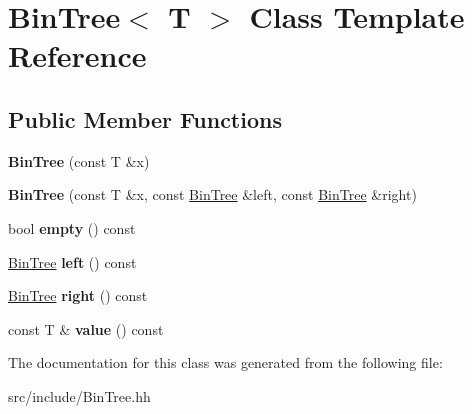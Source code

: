 \hypertarget{classBinTree}{}\section{Bin\+Tree$<$ T $>$ Class Template Reference}
\label{classBinTree}
\subsection*{Public Member Functions}
\begin{DoxyCompactItemize}
\item 
\mbox{\label{classBinTree_a1ab686e0bcf990093ff91fe71744c1a4}} 
{\bfseries Bin\+Tree} (const T \&x)
\item 
\mbox{\label{classBinTree_adb7eeff76d08130c943b36af215eb521}} 
{\bfseries Bin\+Tree} (const T \&x, const \hyperlink{classBinTree}{Bin\+Tree} \&left, const \hyperlink{classBinTree}{Bin\+Tree} \&right)
\item 
\mbox{\label{classBinTree_a74cda259ba5c25b8ee38ed4dc33e4fad}} 
bool {\bfseries empty} () const
\item 
\mbox{\label{classBinTree_a82108db4c1b08d1f111027788c196d4e}} 
\hyperlink{classBinTree}{Bin\+Tree} {\bfseries left} () const
\item 
\mbox{\label{classBinTree_aff8e96651b27284c329667b5ad3e4d0b}} 
\hyperlink{classBinTree}{Bin\+Tree} {\bfseries right} () const
\item 
\mbox{\label{classBinTree_a734e785b089c87b49187ee7c58edf5f3}} 
const T \& {\bfseries value} () const
\end{DoxyCompactItemize}


The documentation for this class was generated from the following file\+:\begin{DoxyCompactItemize}
\item 
src/include/Bin\+Tree.\+hh\end{DoxyCompactItemize}
